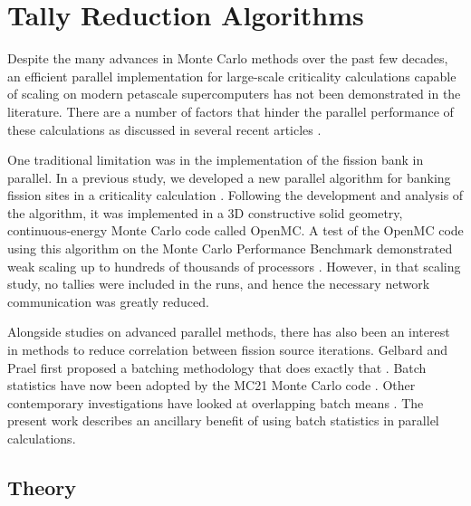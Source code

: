 \chapter{Tally Reduction Algorithms}
\label{chap:tally-reduction}

Despite the many advances in Monte Carlo methods over the past few decades, an
efficient parallel implementation for large-scale criticality calculations
capable of scaling on modern petascale supercomputers has not been demonstrated
in the literature. There are a number of factors that hinder the parallel
performance of these calculations as discussed in several recent articles
\cite{pnst-brown-2011, net-martin-2012}.

One traditional limitation was in the implementation of the fission bank in
parallel. In a previous study, we developed a new parallel algorithm for banking
fission sites in a criticality calculation \cite{nse-romano-2012}. Following the
development and analysis of the algorithm, it was implemented in a 3D
constructive solid geometry, continuous-energy Monte Carlo code called OpenMC. A
test of the OpenMC code using this algorithm on the Monte Carlo Performance
Benchmark demonstrated weak scaling up to hundreds of thousands of processors
\cite{ane-romano-2013}. However, in that scaling study, no tallies were included
in the runs, and hence the necessary network communication was greatly reduced.

Alongside studies on advanced parallel methods, there has also been an interest
in methods to reduce correlation between fission source iterations. Gelbard and
Prael first proposed a batching methodology that does exactly that
\cite{pne-gelbard-1990}. Batch statistics have now been adopted by the MC21
Monte Carlo code \cite{physor-kelly-2012}. Other contemporary investigations
have looked at overlapping batch means \cite{ane-ueki-2011}. The present work
describes an ancillary benefit of using batch statistics in parallel
calculations.

\section{Theory}

